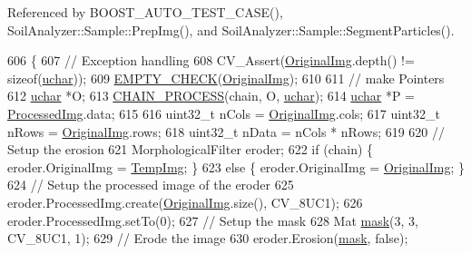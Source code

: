 Referenced by B\+O\+O\+S\+T\+\_\+\+A\+U\+T\+O\+\_\+\+T\+E\+S\+T\+\_\+\+C\+A\+S\+E(), Soil\+Analyzer\+::\+Sample\+::\+Prep\+Img(), and Soil\+Analyzer\+::\+Sample\+::\+Segment\+Particles().


\begin{DoxyCode}
606     \{
607         \textcolor{comment}{// Exception handling}
608         CV\_Assert(\hyperlink{class_vision_1_1_image_processing_a77c370dab270158a4e9c634e2d3f48e7}{OriginalImg}.depth() != \textcolor{keyword}{sizeof}(\hyperlink{_soil_math_types_8h_a65f85814a8290f9797005d3b28e7e5fc}{uchar}));
609         \hyperlink{_image_processing_8h_a27c4e53b88a0f9f2c097add555131056}{EMPTY\_CHECK}(\hyperlink{class_vision_1_1_image_processing_a77c370dab270158a4e9c634e2d3f48e7}{OriginalImg});
610 
611         \textcolor{comment}{// make Pointers}
612         \hyperlink{_soil_math_types_8h_a65f85814a8290f9797005d3b28e7e5fc}{uchar} *O;
613         \hyperlink{_image_processing_8h_a6e6f0183cb53c76ef458d4fd34e07bcd}{CHAIN\_PROCESS}(chain, O, \hyperlink{_soil_math_types_8h_a65f85814a8290f9797005d3b28e7e5fc}{uchar});
614         \hyperlink{_soil_math_types_8h_a65f85814a8290f9797005d3b28e7e5fc}{uchar} *P = \hyperlink{class_vision_1_1_image_processing_aa7d65742882cd1b2a1e4e9cb68809211}{ProcessedImg}.data;
615 
616         uint32\_t nCols = \hyperlink{class_vision_1_1_image_processing_a77c370dab270158a4e9c634e2d3f48e7}{OriginalImg}.cols;
617         uint32\_t nRows = \hyperlink{class_vision_1_1_image_processing_a77c370dab270158a4e9c634e2d3f48e7}{OriginalImg}.rows;
618         uint32\_t nData = nCols * nRows;
619 
620         \textcolor{comment}{// Setup the erosion}
621         MorphologicalFilter eroder;
622         \textcolor{keywordflow}{if} (chain) \{ eroder.OriginalImg = \hyperlink{class_vision_1_1_image_processing_a5371ad8d6f7aac9d43ee5c902ade7435}{TempImg}; \}
623         \textcolor{keywordflow}{else} \{ eroder.OriginalImg = \hyperlink{class_vision_1_1_image_processing_a77c370dab270158a4e9c634e2d3f48e7}{OriginalImg}; \}
624         \textcolor{comment}{// Setup the processed image of the eroder}
625         eroder.ProcessedImg.create(\hyperlink{class_vision_1_1_image_processing_a77c370dab270158a4e9c634e2d3f48e7}{OriginalImg}.size(), CV\_8UC1);
626         eroder.ProcessedImg.setTo(0);
627         \textcolor{comment}{// Setup the mask}
628         Mat \hyperlink{_gen_blob_8m_a5d76cc2129e79ba1941d2cc2f53b9e8e}{mask}(3, 3, CV\_8UC1, 1);
629         \textcolor{comment}{// Erode the image}
630         eroder.Erosion(\hyperlink{_gen_blob_8m_a5d76cc2129e79ba1941d2cc2f53b9e8e}{mask}, \textcolor{keyword}{false});

\end{DoxyCode}

